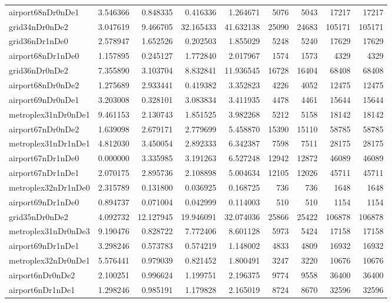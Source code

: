 \begin{longtable}{|l|r|r|r|r|r|r|r|r|}
airport68nDr0nDe1 & 3.546366 & 0.848335 & 0.416336 & 1.264671 & 5076 & 5043 & 17217 & 17217 \\
grid34nDr0nDe2 & 3.047619 & 9.466705 & 32.165433 & 41.632138 & 25090 & 24683 & 105171 & 105171 \\
grid36nDr1nDe0 & 2.578947 & 1.652526 & 0.202503 & 1.855029 & 5248 & 5240 & 17629 & 17629 \\
airport68nDr1nDe0 & 1.157895 & 0.245127 & 1.772840 & 2.017967 & 1574 & 1573 & 4329 & 4329 \\
grid36nDr0nDe2 & 7.355890 & 3.103704 & 8.832841 & 11.936545 & 16728 & 16404 & 68408 & 68408 \\
airport68nDr0nDe2 & 1.275689 & 2.933441 & 0.419382 & 3.352823 & 4226 & 4052 & 12475 & 12475 \\
airport69nDr0nDe1 & 3.203008 & 0.328101 & 3.083834 & 3.411935 & 4478 & 4461 & 15644 & 15644 \\
metroplex31nDr0nDe1 & 9.461153 & 2.130743 & 1.851525 & 3.982268 & 5212 & 5158 & 18142 & 18142 \\
airport67nDr0nDe2 & 1.639098 & 2.679171 & 2.779699 & 5.458870 & 15390 & 15110 & 58785 & 58785 \\
metroplex31nDr1nDe1 & 4.812030 & 3.450054 & 2.892333 & 6.342387 & 7598 & 7511 & 28175 & 28175 \\
airport67nDr1nDe0 & 0.000000 & 3.335985 & 3.191263 & 6.527248 & 12942 & 12872 & 46089 & 46089 \\
airport67nDr1nDe1 & 2.070175 & 2.895736 & 2.108898 & 5.004634 & 12105 & 12026 & 45711 & 45711 \\
metroplex32nDr1nDe0 & 2.315789 & 0.131800 & 0.036925 & 0.168725 & 736 & 736 & 1648 & 1648 \\
airport69nDr1nDe0 & 0.894737 & 0.071004 & 0.042999 & 0.114003 & 510 & 510 & 1154 & 1154 \\
grid35nDr0nDe2 & 4.092732 & 12.127945 & 19.946091 & 32.074036 & 25866 & 25422 & 106878 & 106878 \\
metroplex31nDr0nDe3 & 9.190476 & 0.828722 & 7.772406 & 8.601128 & 5973 & 5424 & 17158 & 17158 \\
airport69nDr1nDe1 & 3.298246 & 0.573783 & 0.574219 & 1.148002 & 4833 & 4809 & 16932 & 16932 \\
metroplex32nDr0nDe1 & 5.576441 & 0.979039 & 0.821452 & 1.800491 & 3247 & 3220 & 10676 & 10676 \\
airport6nDr0nDe2 & 2.100251 & 0.996624 & 1.199751 & 2.196375 & 9774 & 9558 & 36400 & 36400 \\
airport6nDr1nDe1 & 1.298246 & 0.985191 & 1.179828 & 2.165019 & 8724 & 8670 & 32596 & 32596 \\

\end{longtable}
